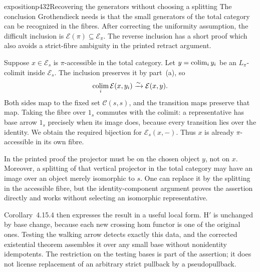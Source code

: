 \begin{dcomment}{exposition}{p432}{Recovering the generators without choosing a splitting}
The conclusion Grothendieck needs is that the small generators of the total category can be recognized in the fibres. After correcting the uniformity assumption, the difficult inclusion is $\mathcal E(\pi)\subseteq\mathcal E_\pi$. The reverse inclusion has a short proof which also avoids a strict-fibre ambiguity in the printed retract argument.

Suppose $x\in\mathcal E_s$ is $\pi$-accessible in the total category. Let $y=\mathop{\rm colim}_i y_i$ be an $L_\pi$-colimit inside $\mathcal E_s$. The inclusion preserves it by part~(a), so
\[
 \mathop{\rm colim}_i\mathcal E(x,y_i)
       \xrightarrow{\sim}\mathcal E(x,y).
\]
Both sides map to the fixed set $\mathcal C(s,s)$, and the transition maps preserve that map. Taking the fibre over $1_s$ commutes with the colimit: a representative has base arrow $1_s$ precisely when its image does, because every transition lies over the identity. We obtain the required bijection for $\mathcal E_s(x,-)$. Thus $x$ is already $\pi$-accessible in its own fibre.

In the printed proof the projector must be on the chosen object $y$, not on $x$. Moreover, a splitting of that vertical projector in the total category may have an image over an object merely isomorphic to $s$. One can replace it by the splitting in the accessible fibre, but the identity-component argument proves the assertion directly and works without selecting an isomorphic representative.

Corollary~4.15.4 then expresses the result in a useful local form. H$'$ is unchanged by base change, because each new crossing hom functor is one of the original ones. Testing the walking arrow detects exactly this data, and the corrected existential theorem assembles it over any small base without nonidentity idempotents. The restriction on the testing bases is part of the assertion; it does not license replacement of an arbitrary strict pullback by a pseudopullback.
\end{dcomment}



